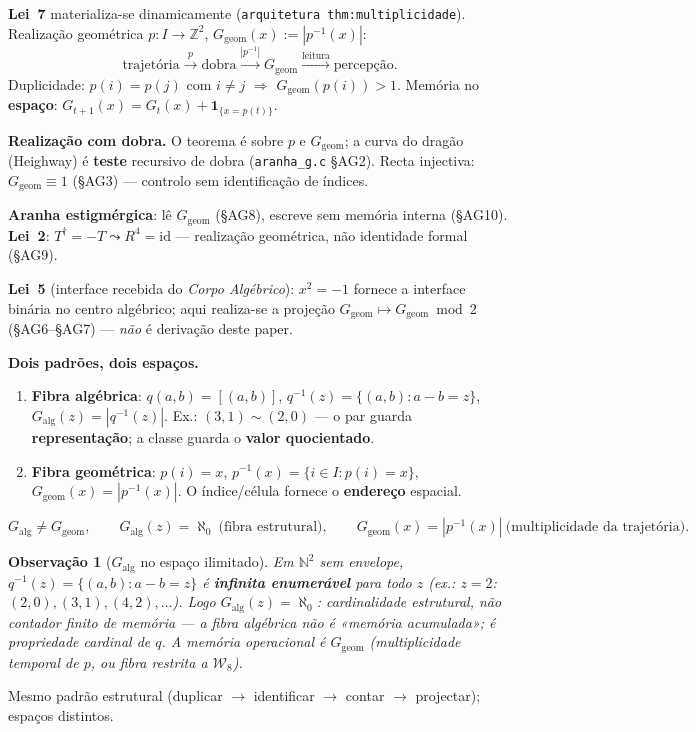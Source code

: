 \documentclass[11pt,a4paper]{article}
\newtheorem{observacao}{Observação}
\newcommand{\code}[1]{\texttt{\small #1}}
\newcommand{\dg}{^{\dagger}}
\newcommand{\Word}{\mathcal{W}}
\begin{document}
\noindent\textbf{Lei~7} materializa-se dinamicamente
(\code{arquitetura thm:multiplicidade}). Realização geométrica
$p\colon I\to\mathbb{Z}^{2}$, $G_{\mathrm{geom}}(x):=|p^{-1}(x)|$:
\[
\boxed{
\text{trajetória}\xrightarrow{\,p\,}\text{dobra}\xrightarrow{|p^{-1}|}
G_{\mathrm{geom}}\xrightarrow{\text{leitura}}\text{percepção}.
}
\]
Duplicidade: $p(i)=p(j)$ com $i\neq j$ $\Rightarrow$ $G_{\mathrm{geom}}(p(i))>1$.
Memória no \textbf{espaço}: $G_{t+1}(x)=G_{t}(x)+\mathbf{1}_{\{x=p(t)\}}$.

\medskip\noindent\textbf{Realização com dobra.} O teorema é sobre $p$ e
$G_{\mathrm{geom}}$; a curva do dragão (Heighway) é \textbf{teste} recursivo
de dobra (\code{aranha\_g.c} §AG2). Recta injectiva: $G_{\mathrm{geom}}\equiv1$
(§AG3) --- controlo sem identificação de índices.

\medskip\noindent\textbf{Aranha estigmérgica}: lê $G_{\mathrm{geom}}$ (§AG8),
escreve sem memória interna (§AG10). \textbf{Lei~2}:
$T\dg=-T\leadsto R^{4}=\mathrm{id}$ --- realização geométrica, não
identidade formal (§AG9).

\medskip\noindent\textbf{Lei~5} (interface recebida do \emph{Corpo Algébrico}):
$x^{2}=-1$ fornece a interface binária no centro algébrico; aqui
realiza-se a projeção $G_{\mathrm{geom}}\mapsto G_{\mathrm{geom}}\bmod 2$
(§AG6--§AG7) --- \emph{não} é derivação deste paper.

\medskip\noindent\textbf{Dois padrões, dois espaços.}
\begin{enumerate}\itemsep2pt
\item \textbf{Fibra algébrica}: $q(a,b)=[(a,b)]$,
      $q^{-1}(z)=\{(a,b):a-b=z\}$, $G_{\mathrm{alg}}(z)=|q^{-1}(z)|$.
      Ex.: $(3,1)\sim(2,0)$ --- o par guarda \textbf{representação}; a
      classe guarda o \textbf{valor quocientado}.
\item \textbf{Fibra geométrica}: $p(i)=x$,
      $p^{-1}(x)=\{i\in I:p(i)=x\}$, $G_{\mathrm{geom}}(x)=|p^{-1}(x)|$.
      O índice/célula fornece o \textbf{endereço} espacial.
\end{enumerate}
\[
\boxed{
G_{\mathrm{alg}}\neq G_{\mathrm{geom}},\qquad
G_{\mathrm{alg}}(z)=\aleph_0\ \text{(fibra estrutural)},\qquad
G_{\mathrm{geom}}(x)=|p^{-1}(x)|\ \text{(multiplicidade da trajetória)}.
}
\]
\begin{observacao}[$G_{\mathrm{alg}}$ no espaço ilimitado]\label{obs:galg}
Em $\mathbb{N}^{2}$ sem envelope, $q^{-1}(z)=\{(a,b):a-b=z\}$ é
\textbf{infinita enumerável} para todo $z$ (ex.: $z=2$:
$(2,0),(3,1),(4,2),\ldots$). Logo $G_{\mathrm{alg}}(z)=\aleph_0$:
cardinalidade \emph{estrutural}, não contador finito de memória --- a
fibra algébrica não é «memória acumulada»; é propriedade cardinal de $q$.
A memória operacional é $G_{\mathrm{geom}}$ (multiplicidade temporal de $p$,
ou fibra restrita a $\Word_8$).
\end{observacao}
Mesmo padrão estrutural (duplicar $\to$ identificar $\to$ contar $\to$
projectar); espaços distintos.
\end{document}
